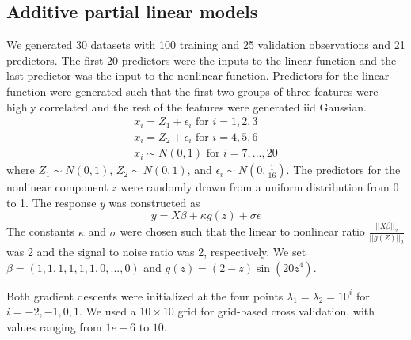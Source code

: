 \documentclass[10pt,letterpaper]{article}
\begin{document}
\subsection{Additive partial linear models}

We generated 30 datasets with 100 training and 25 validation observations and 21 predictors. The first 20 predictors were the inputs to the linear function and the last predictor was the input to the nonlinear function. Predictors for the linear function were generated such that the first two groups of three features were highly correlated and the rest of the features were generated iid Gaussian.
\begin{equation}
\begin{array}{c}
x_i = Z_1 + \epsilon_i \text{ for } i=1, 2, 3 \\
x_i = Z_2 + \epsilon_i \text{ for } i= 4, 5, 6 \\
x_i \sim N(0,1) \text{ for } i = 7, ..., 20
\end{array}
\end{equation}
where $Z_1 \sim N(0,1)$, $Z_2 \sim N(0,1)$, and $\epsilon_i \sim N(0, \frac{1}{16})$. The predictors for the nonlinear component $z$ were randomly drawn from a uniform distribution from 0 to 1. The response $y$ was constructed as
\begin{equation}
y = X\beta + \kappa g(z) + \sigma \epsilon
\end{equation}
The constants $\kappa$ and $\sigma$ were chosen such that the linear to nonlinear ratio $\frac{||X\beta||_2}{||g(Z)||_2}$ was 2 and the signal to noise ratio was 2, respectively. We set $\beta = (1, 1, 1, 1, 1, 1, 0, ..., 0)$ and $g(z) =(2-z)\sin(20z^4)$.

Both gradient descents were initialized at the four points $\lambda_1 = \lambda_2 = 10^i$ for $i=-2, -1, 0, 1$. We used a $10 \times 10$ grid for grid-based cross validation, with values ranging from $1e-6$ to $10$.
\end{document}
